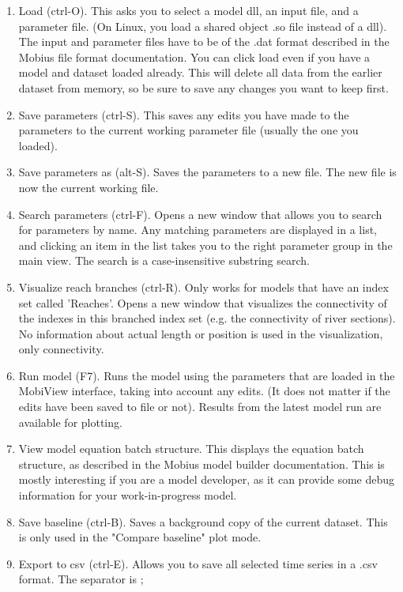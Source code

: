 \documentclass[11pt]{article}
\theoremstyle{definition}
\begin{document}
\begin{enumerate}
\item Load (ctrl-O). This asks you to select a model dll, an input file, and a parameter file. (On Linux, you load a shared object .so file instead of a dll). The input and parameter files have to be of the .dat format described in the Mobius file format documentation. You can click load even if you have a model and dataset loaded already. This will delete all data from the earlier dataset from memory, so be sure to save any changes you want to keep first.
\item Save parameters (ctrl-S). This saves any edits you have made to the parameters to the current working parameter file (usually the one you loaded).
\item Save parameters as (alt-S). Saves the parameters to a new file. The new file is now the current working file.
\item Search parameters (ctrl-F). Opens a new window that allows you to search for parameters by name. Any matching parameters are displayed in a list, and clicking an item in the list takes you to the right parameter group in the main view. The search is a case-insensitive substring search.
\item Visualize reach branches (ctrl-R). Only works for models that have an index set called 'Reaches'. Opens a new window that visualizes the connectivity of the indexes in this branched index set (e.g. the connectivity of river sections). No information about actual length or position is used in the visualization, only connectivity.
\item Run model (F7). Runs the model using the parameters that are loaded in the MobiView interface, taking into account any edits. (It does not matter if the edits have been saved to file or not). Results from the latest model run are available for plotting.
\item View model equation batch structure. This displays the equation batch structure, as described in the Mobius model builder documentation. This is mostly interesting if you are a model developer, as it can provide some debug information for your work-in-progress model.
\item Save baseline (ctrl-B). Saves a background copy of the current dataset. This is only used in the "Compare baseline" plot mode.
\item Export to csv (ctrl-E). Allows you to save all selected time series in a .csv format. The separator is ;
\end{enumerate}
\end{document}

